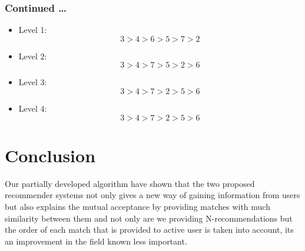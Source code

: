 \documentclass[10pt, compress]{beamer}
\begin{document}
\begin{frame}[fragile]
  \frametitle{Continued \ldots}
  \begin{itemize}
  \item<1> \alert{Level 1}:  \[3 > 4 > 6 > 5 > 7 > 2\]
  \item<1> \alert{Level 2}:  \[3 > 4 > 7 > 5 > 2 > 6\]
  \item<1> \alert{Level 3}:  \[3 > 4 > 7 > 2 > 5 > 6\]
  \item<1> \alert{Level 4}:  \[3 > 4 > 7 > 2 > 5 > 6\]
 \end{itemize}
\end{frame}
\section{Conclusion}

\begin{frame}
Our partially developed algorithm have shown that the two proposed recommender systems not only gives a new way of gaining information from users but also explains the mutual acceptance by providing matches with much similarity between them and not only are we providing N-recommendations but the order of each match that is provided to active user is taken into account, its an improvement in the field known less important.

\end{frame}

\end{document}
